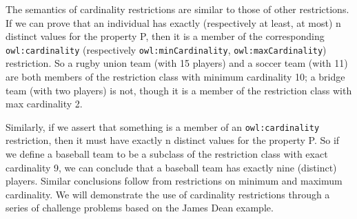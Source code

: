 The semantics of cardinality restrictions are similar to those of other
restrictions. If we can prove that
an individual has exactly (respectively at least, at most) n distinct
values for the property P, then it is a member of the corresponding
\texttt{owl:cardinality} (respectively \texttt{owl:minCardinality}, \texttt{owl:maxCardinality})
restriction. So a rugby union team (with 15 players) and a soccer team
(with 11) are both members of the restriction class with minimum
cardinality 10; a bridge team (with two players) is not, though it is a
member of the restriction class with max cardinality 2.

Similarly, if we assert that something is a member of an \texttt{owl:cardinality}
restriction, then it must have exactly n distinct values for the
property P. So if we define a baseball team to be a subclass of the
restriction class with exact cardinality 9, we can conclude that a
baseball team has exactly nine (distinct) players. Similar conclusions
follow from restrictions on minimum and maximum cardinality. We will
demonstrate the use of cardinality restrictions through a series of
challenge problems based on the James Dean example.

